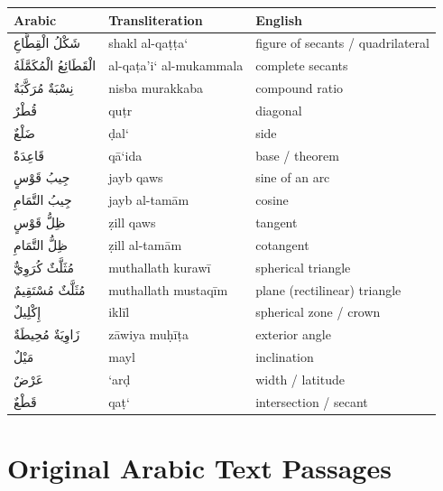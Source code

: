 \documentclass[11pt,a4paper]{article}
\theoremstyle{plain}
\theoremstyle{definition}
\theoremstyle{remark}
\newcommand{\ar}[1]{{\arabicfont\beginR #1\endR}}
\begin{document}
\begin{center}
\begin{longtable}{lll}
\toprule
\textbf{Arabic} & \textbf{Transliteration} & \textbf{English} \\
\midrule
\endhead
\ar{شَكْلُ الْقِطَّاعِ} & shakl al-qa\d{t}\d{t}a` & figure of secants / quadrilateral \\
\ar{الْقَطَائِعُ الْمُكَمَّلَةُ} & al-qa\d{t}a'i` al-mukammala & complete secants \\
\ar{نِسْبَةٌ مُرَكَّبَةٌ} & nisba murakkaba & compound ratio \\
\ar{قُطْرٌ} & qu\d{t}r & diagonal \\
\ar{ضَلْعٌ} & \d{d}al` & side \\
\ar{قَاعِدَةٌ} & q\=a`ida & base / theorem \\
\ar{جِيبُ قَوْسٍ} & jayb qaws & sine of an arc \\
\ar{جِيبُ التَّمَامِ} & jayb al-tam\=am & cosine \\
\ar{ظِلُّ قَوْسٍ} & \d{z}ill qaws & tangent \\
\ar{ظِلُّ التَّمَامِ} & \d{z}ill al-tam\=am & cotangent \\
\ar{مُثَلَّثٌ كُرَوِيٌّ} & muthallath kuraw\=i & spherical triangle \\
\ar{مُثَلَّثٌ مُسْتَقِيمٌ} & muthallath mustaq\=im & plane (rectilinear) triangle \\
\ar{إِكْلِيلٌ} & ikl\=il & spherical zone / crown \\
\ar{زَاوِيَةٌ مُحِيطَةٌ} & z\=awiya mu\d{h}\=i\d{t}a & exterior angle \\
\ar{مَيْلٌ} & mayl & inclination \\
\ar{عَرْضٌ} & `ar\d{d} & width / latitude \\
\ar{قَطْعٌ} & qa\d{t}` & intersection / secant \\
\bottomrule
\end{longtable}
\end{center}

\clearpage

\section*{Original Arabic Text Passages}
\end{document}
